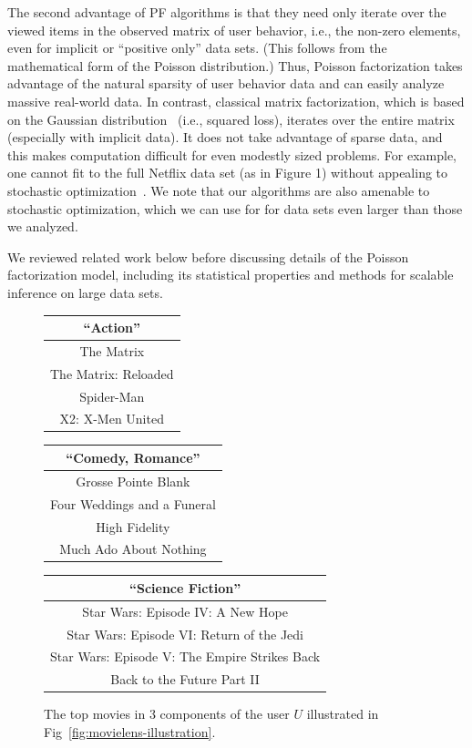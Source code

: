The second advantage of PF algorithms is that they need only iterate
over the viewed items in the observed matrix of user behavior, i.e.,
the non-zero elements, even for implicit or ``positive only'' data
sets.  (This follows from the mathematical form of the Poisson
distribution.)  Thus, Poisson factorization takes advantage of the
natural sparsity of user behavior data and can easily analyze massive
real-world data.  In contrast, classical matrix factorization, which
is based on the Gaussian distribution~\cite{Salakhutdinov:2008} (i.e.,
squared loss), iterates over the entire matrix (especially with
implicit data).  It does not take advantage of sparse data, and this
makes computation difficult for even modestly sized problems.  For
example, one cannot fit to the full Netflix data set (as in Figure 1)
without appealing to stochastic optimization~\cite{Mairal:2010}.  We
note that our algorithms are also amenable to stochastic optimization,
which we can use for for data sets even larger than those we analyzed.

We reviewed related work below before discussing details of the
Poisson factorization model, including its statistical properties and
methods for scalable inference on large data sets.

\begin{figure}[th]
\centering
\caption{The top movies in 3 components of the user $U$ illustrated in
  Fig~\ref{fig:movielens-illustration}.}
\vspace{0.1cm}
\small
\begin{tabular}{c}
\toprule
\bf{``Action''}\\
\midrule
The Matrix\\
The Matrix: Reloaded\\
Spider-Man\\
X2: X-Men United\\
\bottomrule
\end{tabular}
\begin{tabular}{c}
\toprule
\bf{``Comedy, Romance''}\\
\midrule
Grosse Pointe Blank\\
Four Weddings and a Funeral\\
High Fidelity\\
Much Ado About Nothing\\
\bottomrule
\end{tabular}
\begin{tabular}{c}
\toprule
\bf{``Science Fiction''}\\
\midrule
Star Wars: Episode IV: A New Hope\\
Star Wars: Episode VI: Return of the Jedi\\
Star Wars: Episode V: The Empire Strikes Back\\
Back to the Future Part II\\
\bottomrule
\end{tabular}
\end{figure}

